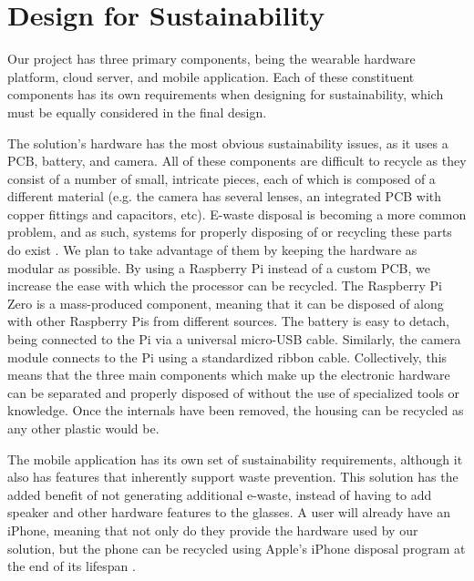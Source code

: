 \documentclass[a4paper,11pt]{article}
\begin{document}
\section{Design for Sustainability}
Our project has three primary components, being the wearable hardware platform, cloud server, and mobile application. Each of these constituent components has its own requirements when designing for sustainability, which must be equally considered in the final design.

The solution's hardware has the most obvious sustainability issues, as it uses a PCB, battery, and camera. All of these components are difficult to recycle as they consist of a number of small, intricate pieces, each of which is composed of a different material (e.g. the camera has several lenses, an integrated PCB with copper fittings and capacitors, etc). E-waste disposal is becoming a more common problem, and as such, systems for properly disposing of or recycling these parts do exist \cite{ewaste}. We plan to take advantage of them by keeping the hardware as modular as possible. By using a Raspberry Pi instead of a custom PCB, we increase the ease with which the processor can be recycled. The Raspberry Pi Zero is a mass-produced component, meaning that it can be disposed of along with other Raspberry Pis from different sources. The battery is easy to detach, being connected to the Pi via a universal micro-USB cable. Similarly, the camera module connects to the Pi using a standardized ribbon cable. Collectively, this means that the three main components which make up the electronic hardware can be separated and properly disposed of without the use of specialized tools or knowledge. Once the internals have been removed, the housing can be recycled as any other plastic would be.

The mobile application has its own set of sustainability requirements, although it also has features that inherently support waste prevention. This solution has the added benefit of not generating additional e-waste, instead of having to add speaker and other hardware features to the glasses. A user will already have an iPhone, meaning that not only do they provide the hardware used by our solution, but the phone can be recycled using Apple's iPhone disposal program at the end of its lifespan \cite{iphone-recycle}.
\end{document}
